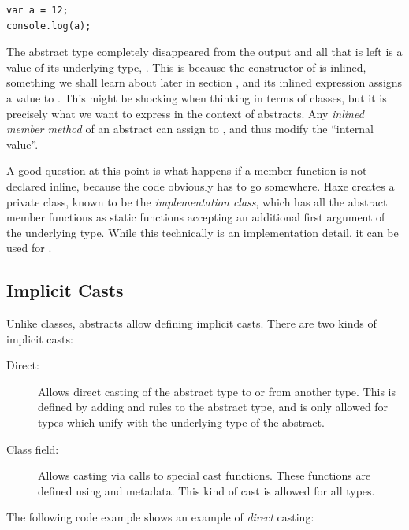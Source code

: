 \documentclass{haxe}
\begin{document}
\begin{lstlisting}
var a = 12;
console.log(a);
\end{lstlisting}
The abstract type  completely disappeared from the output and all that is left is a value of its underlying type, . This is because the constructor of  is inlined, something we shall learn about later in section , and its inlined expression assigns a value to . This might be shocking when thinking in terms of classes, but it is precisely what we want to express in the context of abstracts. Any \emph{inlined member method} of an abstract can assign to , and thus modify the ``internal value''.

A good question at this point is what happens if a member function is not declared inline, because the code obviously has to go somewhere. Haxe creates a private class, known to be the \emph{implementation class}, which has all the abstract member functions as static functions accepting an additional first argument  of the underlying type. While this technically is an implementation detail, it can be used for .







\subsection{Implicit Casts}
\label{types-abstract-implicit-casts}

Unlike classes, abstracts allow defining implicit casts. There are two kinds of implicit casts:

\begin{description}
	\item[Direct:] Allows direct casting of the abstract type to or from another type. This is defined by adding  and  rules to the abstract type, and is only allowed for types which unify with the underlying type of the abstract.
	\item[Class field:] Allows casting via calls to special cast functions. These functions are defined using  and  metadata. This kind of cast is allowed for all types.
\end{description}
The following code example shows an example of \emph{direct} casting:
\end{document}
